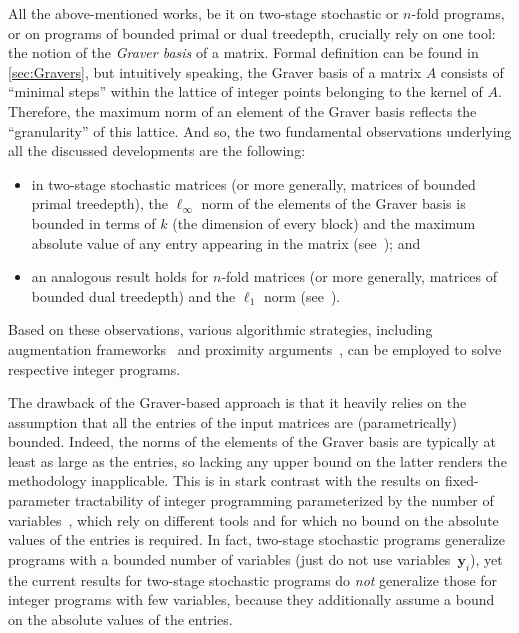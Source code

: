 \documentclass{theoretics}
\newcommand{\tup}[1]{{\mathbf{#1}}}
\newcommand{\yy}{\tup y}
\begin{document}
All the above-mentioned works, be it on two-stage stochastic or $n$-fold programs, or on programs of bounded primal or dual treedepth, crucially rely on one tool: the notion of the {\em{Graver basis}} of a matrix. Formal definition can be found in \cref{sec:Gravers}, but intuitively speaking, the Graver basis of a matrix $A$ consists of ``minimal steps'' within the lattice of integer points belonging to the kernel of $A$. Therefore, the maximum norm of an element of the Graver basis reflects the ``granularity'' of this lattice. And so, the two fundamental observations underlying all the discussed developments are the following:
\begin{itemize}[nosep]
    \item in two-stage stochastic matrices (or more generally, matrices of bounded primal treedepth), the $\ell_\infty$ norm of the elements of the Graver basis is bounded in terms of $k$ (the dimension of every block) and the maximum absolute value of any entry appearing in the matrix (see~\cite[Lemma~28]{monster}); and
    \item an analogous result holds for $n$-fold matrices (or more generally, matrices of bounded dual treedepth) and the $\ell_1$ norm (see~\cite[Lemma~30]{monster}).
\end{itemize}
Based on these observations, various algorithmic strategies, including augmentation frameworks~\cite{JansenLR20,KouteckyLO18} and proximity arguments~\cite{CslovjecsekEHRW21,CslovjecsekEPVW21,EisenbrandHK18}, can be employed to solve respective integer programs.

The drawback of the Graver-based approach is that it heavily relies on the assumption that all the entries of the input matrices are (parametrically) bounded. Indeed, the norms of the elements of the Graver basis are typically at least as large as the entries, so lacking any upper bound on the latter renders the methodology inapplicable. This is in stark contrast with the results on fixed-parameter tractability of integer programming parameterized by the number of variables~\cite{Dadush12,DadushER23,FrankTardos1987,kannan1987minkowski,Lenstra1983,ReisR23}, which rely on different tools and for which no bound on the absolute values of the entries is required. In fact, two-stage stochastic programs generalize programs with a bounded number of variables (just do not use variables~$\yy_i$), yet the current results for two-stage stochastic programs do {\em{not}} generalize those for integer programs with few variables, because they additionally assume a bound on the absolute values of the entries.
\end{document}
